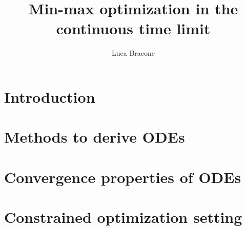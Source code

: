 \documentclass{article}
\title{Min-max optimization in the continuous time limit}
\author{Luca Bracone}
\theoremstyle{remark}
\begin{document}


\clearpage
\thispagestyle{empty}
\tableofcontents

\clearpage
{}
\setcounter{page}{1}

\section{Introduction}

\section{Methods to derive ODEs}\label{chap:osr}

\section{Convergence properties of ODEs}

\section{Constrained optimization setting}




\end{document}
